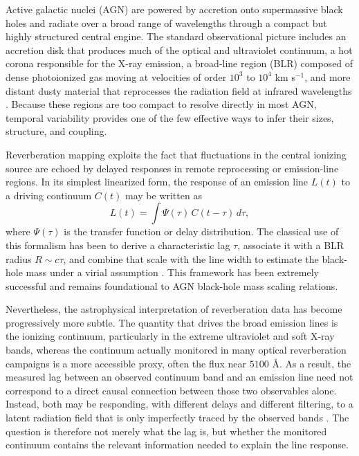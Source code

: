 \documentclass[12pt, a4paper]{article}
\begin{document}
Active galactic nuclei (AGN) are powered by accretion onto supermassive black holes and radiate over a broad range of wavelengths through a compact but highly structured central engine. The standard observational picture includes an accretion disk that produces much of the optical and ultraviolet continuum, a hot corona responsible for the X-ray emission, a broad-line region (BLR) composed of dense photoionized gas moving at velocities of order \(10^3\) to \(10^4\) km s\(^{-1}\), and more distant dusty material that reprocesses the radiation field at infrared wavelengths \cite{Peterson2004,Netzer2013,Cackett2021}. Because these regions are too compact to resolve directly in most AGN, temporal variability provides one of the few effective ways to infer their sizes, structure, and coupling.

Reverberation mapping exploits the fact that fluctuations in the central ionizing source are echoed by delayed responses in remote reprocessing or emission-line regions. In its simplest linearized form, the response of an emission line \(L(t)\) to a driving continuum \(C(t)\) may be written as
\begin{equation}
L(t) = \int \Psi(\tau)\,C(t-\tau)\,d\tau,
\end{equation}
where \(\Psi(\tau)\) is the transfer function or delay distribution. The classical use of this formalism has been to derive a characteristic lag \(\tau\), associate it with a BLR radius \(R \sim c\tau\), and combine that scale with the line width to estimate the black-hole mass under a virial assumption \cite{Peterson2004,BentzKatz2015}. This framework has been extremely successful and remains foundational to AGN black-hole mass scaling relations.

Nevertheless, the astrophysical interpretation of reverberation data has become progressively more subtle. The quantity that drives the broad emission lines is the ionizing continuum, particularly in the extreme ultraviolet and soft X-ray bands, whereas the continuum actually monitored in many optical reverberation campaigns is a more accessible proxy, often the flux near \(5100\) \AA. As a result, the measured lag between an observed continuum band and an emission line need not correspond to a direct causal connection between those two observables alone. Instead, both may be responding, with different delays and different filtering, to a latent radiation field that is only imperfectly traced by the observed bands \cite{Cackett2021}. The question is therefore not merely what the lag is, but whether the monitored continuum contains the relevant information needed to explain the line response.
\end{document}
